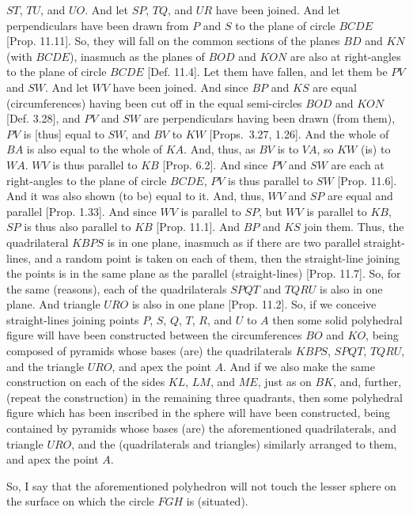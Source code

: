 \begin{Parallel}{}{}
{$ST$, $TU$, and $UO$. And let $SP$, $TQ$, and $UR$ have been joined. And let perpendiculars have been drawn from
$P$ and $S$ to the plane of circle $BCDE$ [Prop. 11.11]. So, they will fall on the common sections of the planes $BD$ and $KN$ (with $BCDE$),
inasmuch as the planes of $BOD$ and $KON$ are also at right-angles to the plane of circle $BCDE$ [Def. 11.4].
Let them have fallen, and let them be $PV$ and $SW$.  And let $WV$ have been joined.  And since  $BP$ and
$KS$ are equal (circumferences) having been cut off  in the equal semi-circles $BOD$ and $KON$ [Def. 3.28], and  $PV$ and $SW$ are
perpendiculars having been drawn (from them), $PV$ is [thus] equal to $SW$, and $BV$ to $KW$ [Props.~3.27, 1.26]. And the whole of
$BA$ is also equal to the whole of $KA$. And, thus, as $BV$ is to $VA$, so $KW$ (is) to $WA$. 
$WV$ is thus parallel to $KB$ [Prop. 6.2]. And since $PV$ and $SW$ are each at right-angles to the plane
of circle $BCDE$,  $PV$ is thus parallel to $SW$ [Prop. 11.6]. And it was also shown (to be) equal to it.
And, thus, $WV$ and $SP$ are equal and parallel [Prop. 1.33]. And since $WV$ is parallel to $SP$,
but $WV$ is parallel to $KB$, $SP$ is thus also parallel to $KB$ [Prop. 11.1]. And  $BP$ and
$KS$ join them. Thus, the quadrilateral $KBPS$ is in one plane, inasmuch as if there are two parallel
straight-lines, and a random point is taken on each of them, then the straight-line joining the points is in the same plane as
the parallel (straight-lines) [Prop. 11.7]. So, for the same (reasons), each of the quadrilaterals
$SPQT$ and $TQRU$ is also in one plane. And triangle $URO$ is also in one plane [Prop. 11.2].
So, if we conceive straight-lines joining points $P$, $S$, $Q$, $T$, $R$,
and $U$ to $A$ then some solid polyhedral  figure will have been constructed between the circumferences $BO$ and $KO$,
being composed of pyramids whose bases (are) the quadrilaterals $KBPS$, $SPQT$, $TQRU$, and the triangle $URO$, 
and apex the point $A$. And if we also make the same construction on each of the sides $KL$, $LM$, and $ME$, just as on $BK$, 
and, further, (repeat the construction) in the remaining three quadrants, then some polyhedral figure
which has been inscribed in the sphere will have been constructed, being contained by pyramids whose bases (are) the
aforementioned quadrilaterals, and triangle $URO$, and the (quadrilaterals and triangles) similarly arranged
to them, and apex the point $A$.

So, I say that the aforementioned polyhedron  will not touch the lesser sphere on the surface on which  the circle $FGH$ is (situated).

}
\end{Parallel}
